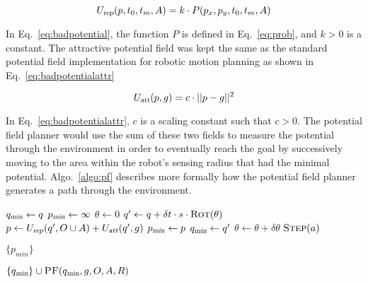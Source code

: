 \begin{equation}
    U_{\Var{rep}}(p, t_0, t_m, A) = k \cdot P(p_x, p_y, t_0, t_m, A)
    \label{eq:badpotential}
\end{equation}

In Eq.~\ref{eq:badpotential}, the function $P$ is defined in Eq.~\ref{eq:prob},
and $k > 0$ is a constant.  The attractive potential field was kept the same as
the standard potential field implementation for robotic motion planning as
shown in Eq.~\ref{eq:badpotentialattr}

\begin{equation}
    U_{\Var{att}}(p, g) = c \cdot ||p - g||^2
    \label{eq:badpotentialattr}
\end{equation}

In Eq.~\ref{eq:badpotentialattr}, $c$ is a scaling constant such that $c > 0$.
The potential field planner would use the sum of these two fields to measure
the potential through the environment in order to eventually reach the goal by
successively moving to the area within the robot's sensing radius that had the
minimal potential.  Algo.~\ref{algo:pf} describes more formally how the
potential field planner generates a path through the environment.

\begin{algorithm}[ht]

    \caption{$\Function{PF}(q, g, O, A, R)$}

    \label{algo:pf}
    \begin{algorithmic}[1]
        \setcounter{ALC@line}{0}
        \vspace*{1mm}

        \STATE $q_{\Var{min}} \leftarrow q$
        \STATE $p_{\Var{min}} \leftarrow \infty$
        \STATE $\theta \leftarrow 0$
        \WHILE {$\theta \leq 2\pi$}
            \STATE $q' \leftarrow q + \delta t \cdot s \cdot
            \Function{Rot}(\theta)$
            \STATE $p \leftarrow U_{\Var{rep}}(q', O \cup A)
            + U_{\Var{att}}(q', g)$
               \STATE $p_{\Var{min}} \leftarrow p$
                \STATE $q_{\Var{min}} \leftarrow q'$
            \ENDIF
            \STATE $\theta \leftarrow \theta + \delta \theta$
                \STATE $\Function{Step}(a)$
            \ENDFOR
        \ENDWHILE

            \RETURN $\{p_{min}\}$
        \ENDIF

        \RETURN $\{q_{\Var{min}}\} \cup \Function{PF}(q_{\Var{min}}, g, O, A, R)$
    \end{algorithmic}
\end{algorithm}

